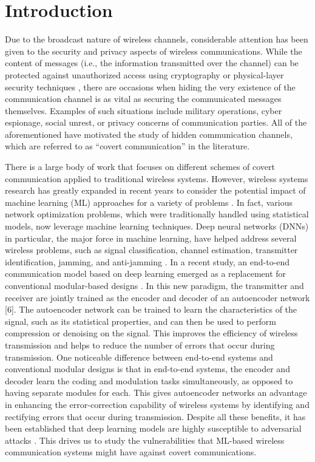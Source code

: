 \section{Introduction}
\label{s:intro}
Due to the broadcast nature of wireless channels, considerable attention has been given to the security and privacy aspects of wireless communications. While the content of messages (i.e., the information transmitted over the channel) can be protected against unauthorized access using cryptography or physical-layer security techniques \cite{zhou2013physical}, there are occasions when hiding the very existence of the communication channel is as vital as securing the communicated messages themselves. Examples of such situations include military operations, cyber espionage, social unrest, or privacy concerns of communication parties. All of the aforementioned have motivated the study of hidden communication channels, which are referred to as ``covert communication'' \cite{lampson1973note} in the literature.

There is a large body of work that focuses on different schemes of covert communication applied to traditional wireless systems. However, wireless systems research has greatly expanded in recent years to consider the potential impact of machine learning (ML) approaches for a variety of problems \cite{wang2017deep}. In fact, various network optimization problems, which were traditionally handled using statistical models, now leverage machine learning techniques. Deep neural networks (DNNs) in particular, the major force in machine learning, have helped address several wireless problems, such as signal classification, channel estimation, transmitter identification, jamming, and anti-jamming \cite{bahramali2021robust}. In a recent study, an end-to-end communication model based on deep learning emerged as a replacement for conventional modular-based designs \cite{o2017introduction}. In this new paradigm, the transmitter and receiver are jointly trained as the encoder and decoder of an autoencoder network [6]. The autoencoder network can be trained to learn the characteristics of the signal, such as its statistical properties, and can then be used to perform compression or denoising on the signal. This improves the efficiency of wireless transmission and helps to reduce the number of errors that occur during transmission. One noticeable difference between end-to-end systems and conventional modular designs is that in end-to-end systems, the encoder and decoder learn the coding and modulation tasks simultaneously, as opposed to having separate modules for each. This gives autoencoder networks an advantage in enhancing the error-correction capability of wireless systems by identifying and rectifying errors that occur during transmission. Despite all these benefits, it has been established that deep learning models are highly susceptible to adversarial attacks \cite{bahramali2021robust, chakraborty2018adversarial}. This drives us to study the vulnerabilities that ML-based wireless communication systems might have against covert communications.

